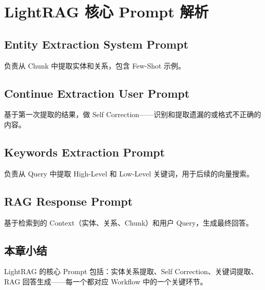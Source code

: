 \section{LightRAG 核心 Prompt 解析}

\subsection{Entity Extraction System Prompt}

负责从 Chunk 中提取实体和关系，包含 Few-Shot 示例。

\subsection{Continue Extraction User Prompt}

基于第一次提取的结果，做 Self Correction——识别和提取遗漏的或格式不正确的内容。

\subsection{Keywords Extraction Prompt}

负责从 Query 中提取 High-Level 和 Low-Level 关键词，用于后续的向量搜索。

\subsection{RAG Response Prompt}

基于检索到的 Context（实体、关系、Chunk）和用户 Query，生成最终回答。

\subsection{本章小结}

LightRAG 的核心 Prompt 包括：实体关系提取、Self Correction、关键词提取、RAG 回答生成——每一个都对应 Workflow 中的一个关键环节。

